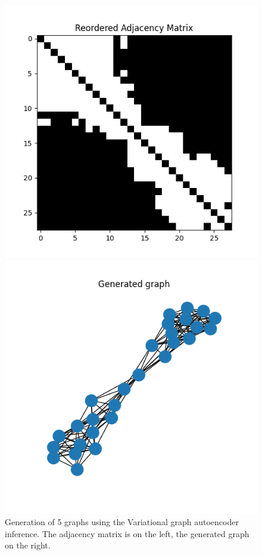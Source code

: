 \documentclass[a4paper]{article}
\begin{document}
\begin{figure}[h]
    \begin{minipage}{.45\textwidth}
      \includegraphics[width=0.7\linewidth]{figures/graph_04_adjacency_matrix.png}
    \end{minipage}\hfill
    \begin{minipage}{.45\textwidth}
      \includegraphics[width=0.7\linewidth]{figures/graph_04_generated_graph.png}
    \end{minipage}
\caption{Generation of 5 graphs using the Variational graph autoencoder inference.
The adjacency matrix is on the left, the generated graph on the right.}
\label{fig:VAE_graph_generation}
\end{figure}
\end{document}
